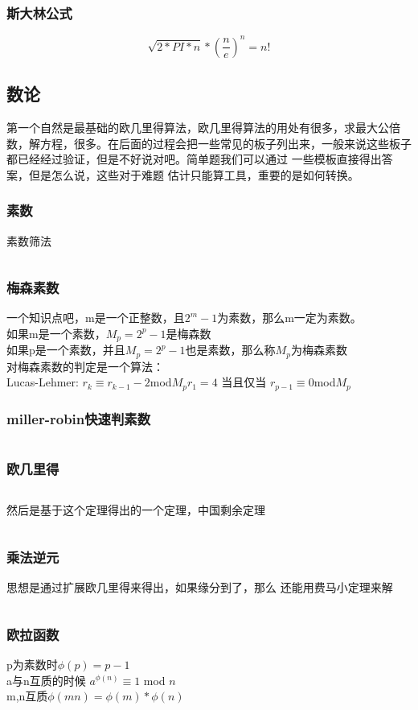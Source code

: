 \documentclass[a4paper,11pt]{article}
\begin{document}
\begin{CJK}{UTF8}{gbsn}
\subsubsection{斯大林公式}
$$ \sqrt{2*PI*n} * (\frac{n}{e})^n = n!$$
\subsection{数论}
第一个自然是最基础的欧几里得算法，欧几里得算法的用处有很多，求最大公倍数，解方程，很多。在后面的过程会把一些常见的板子列出来，一般来说这些板子
都已经经过验证，但是不好说对吧。简单题我们可以通过
一些模板直接得出答案，但是怎么说，这些对于难题
估计只能算工具，重要的是如何转换。
\subsubsection{素数}
素数筛法
\inputminted{c++}{../scoure/math/shai.cpp}
\subsubsection{梅森素数}
一个知识点吧，m是一个正整数，且$2^m-1$为素数，那么m一定为素数。\\
如果m是一个素数，$M_p = 2^p-1$是梅森数\\
如果p是一个素数，并且$M_p = 2^p-1$也是素数，那么称$M_p$为梅森素数\\
对梅森素数的判定是一个算法：\\
Lucas-Lehmer:
$r_k \equiv r_{k-1} -2$\quad mod$M_p$\quad $r_1 = 4$
当且仅当 $r_{p-1} \equiv 0$\quad mod$M_p$
\subsubsection{miller-robin快速判素数}
\inputminted{c++}{../scoure/math/miller_robin.cpp}
\subsubsection{欧几里得}
\inputminted{c++}{../scoure/math/GCD.cpp}
然后是基于这个定理得出的一个定理，中国剩余定理
\inputminted{c++}{../scoure/math/chineseshengyu.cpp}
\subsubsection{乘法逆元}
思想是通过扩展欧几里得来得出，如果缘分到了，那么
还能用费马小定理来解
\inputminted{c++}{../scoure/math/niyuan.cpp}
\subsubsection{欧拉函数}
p为素数时$\phi(p) = p-1 $\\
a与n互质的时候 $a^{\phi(n)}\equiv 1$ mod $ n$\\
m,n互质$\phi(mn) = \phi(m) * \phi(n)$\\


\end{CJK}
\end{document}
